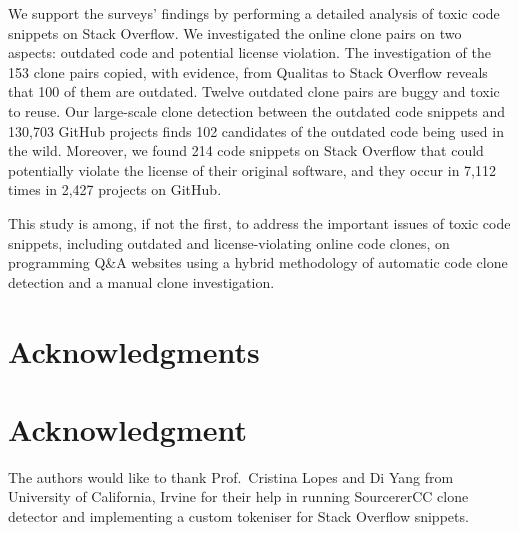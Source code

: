 \documentclass[10pt,journal,compsoc]{IEEEtran}
\begin{document}
We support the surveys' findings by performing a detailed analysis of toxic code
snippets on Stack Overflow. We investigated the online clone pairs on two
aspects: outdated code and potential license violation. The investigation of the
153 clone pairs copied, with evidence, from Qualitas to Stack Overflow reveals
that 100 of them are outdated. Twelve outdated clone pairs are buggy and toxic
to reuse. Our large-scale clone detection between the outdated code snippets 
and 130,703 GitHub projects finds 102 candidates of the outdated code being
used in the wild.
 Moreover, we found 214 code snippets on Stack Overflow that could
potentially violate the license of their original software, and they
occur in 7,112 times in 2,427 projects on GitHub.

This study is among, if not the first, to address the important issues of toxic
code snippets, including outdated and license-violating online code clones, on
programming Q\&A websites using a hybrid methodology of automatic code clone
detection and a manual clone investigation.

\ifCLASSOPTIONcompsoc
  \section*{Acknowledgments}
\else
  \section*{Acknowledgment}
\fi


The authors would like to thank Prof.~Cristina Lopes and Di Yang
from University of California, Irvine
for their help in running SourcererCC clone detector and implementing
a custom tokeniser for Stack Overflow snippets.



  

% 
\end{document}
